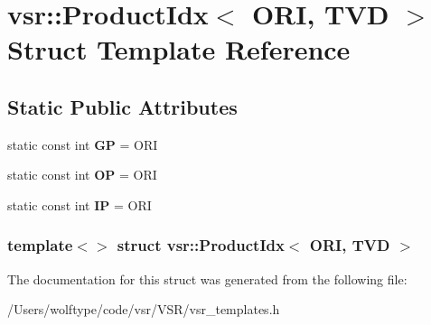 \hypertarget{structvsr_1_1_product_idx_3_01_o_r_i_00_01_t_v_d_01_4}{\section{vsr\-:\-:Product\-Idx$<$ O\-R\-I, T\-V\-D $>$ Struct Template Reference}
\label{structvsr_1_1_product_idx_3_01_o_r_i_00_01_t_v_d_01_4}
}
\subsection*{Static Public Attributes}
\begin{DoxyCompactItemize}
\item 
\hypertarget{structvsr_1_1_product_idx_3_01_o_r_i_00_01_t_v_d_01_4_a1b9d791042bf8642ae3409dc2d8cf015}{static const int {\bfseries G\-P} = O\-R\-I}\label{structvsr_1_1_product_idx_3_01_o_r_i_00_01_t_v_d_01_4_a1b9d791042bf8642ae3409dc2d8cf015}

\item 
\hypertarget{structvsr_1_1_product_idx_3_01_o_r_i_00_01_t_v_d_01_4_a58c28460211a0d8119adcade990c537d}{static const int {\bfseries O\-P} = O\-R\-I}\label{structvsr_1_1_product_idx_3_01_o_r_i_00_01_t_v_d_01_4_a58c28460211a0d8119adcade990c537d}

\item 
\hypertarget{structvsr_1_1_product_idx_3_01_o_r_i_00_01_t_v_d_01_4_a3ec074ebc96bc84bd00c844862766777}{static const int {\bfseries I\-P} = O\-R\-I}\label{structvsr_1_1_product_idx_3_01_o_r_i_00_01_t_v_d_01_4_a3ec074ebc96bc84bd00c844862766777}

\end{DoxyCompactItemize}
\subsubsection*{template$<$$>$ struct vsr\-::\-Product\-Idx$<$ O\-R\-I, T\-V\-D $>$}



The documentation for this struct was generated from the following file\-:\begin{DoxyCompactItemize}
\item 
/\-Users/wolftype/code/vsr/\-V\-S\-R/vsr\-\_\-templates.\-h\end{DoxyCompactItemize}
